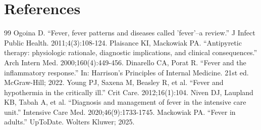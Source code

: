\section*{References}
\begin{thebibliography}{99}
 Ogoina D. ``Fever, fever patterns and diseases called 'fever'--a review.'' J Infect Public Health. 2011;4(3):108-124.
 Plaisance KI, Mackowiak PA. ``Antipyretic therapy: physiologic rationale, diagnostic implications, and clinical consequences.'' Arch Intern Med. 2000;160(4):449-456.
 Dinarello CA, Porat R. ``Fever and the inflammatory response.'' In: Harrison's Principles of Internal Medicine. 21st ed. McGraw-Hill; 2022.
 Young PJ, Saxena M, Beasley R, et al. ``Fever and hypothermia in the critically ill.'' Crit Care. 2012;16(1):104.
 Niven DJ, Laupland KB, Tabah A, et al. ``Diagnosis and management of fever in the intensive care unit.'' Intensive Care Med. 2020;46(9):1733-1745.
 Mackowiak PA. ``Fever in adults.'' UpToDate. Wolters Kluwer; 2025.
\end{thebibliography}

